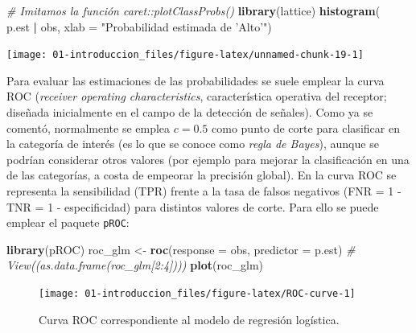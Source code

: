\documentclass[
]{book}
\newenvironment{Shaded}{\begin{snugshade}}{\end{snugshade}}
\newcommand{\CommentTok}[1]{\textcolor[rgb]{0.56,0.35,0.01}{\textit{#1}}}
\newcommand{\DataTypeTok}[1]{\textcolor[rgb]{0.13,0.29,0.53}{#1}}
\newcommand{\KeywordTok}[1]{\textcolor[rgb]{0.13,0.29,0.53}{\textbf{#1}}}
\newcommand{\NormalTok}[1]{#1}
\newcommand{\OperatorTok}[1]{\textcolor[rgb]{0.81,0.36,0.00}{\textbf{#1}}}
\newcommand{\StringTok}[1]{\textcolor[rgb]{0.31,0.60,0.02}{#1}}
\theoremstyle{break}
\theoremstyle{definition}
\theoremstyle{definition}
\theoremstyle{definition}
\theoremstyle{remark}
\begin{document}
\begin{Shaded}
\begin{Highlighting}[]
\CommentTok{# Imitamos la función caret::plotClassProbs()}
\KeywordTok{library}\NormalTok{(lattice) }
\KeywordTok{histogram}\NormalTok{(}\OperatorTok{~}\StringTok{ }\NormalTok{p.est }\OperatorTok{|}\StringTok{ }\NormalTok{obs, }\DataTypeTok{xlab =} \StringTok{"Probabilidad estimada de 'Alto'"}\NormalTok{)}
\end{Highlighting}
\end{Shaded}

\begin{center}\texttt{[image: 01-introduccion\_files/figure-latex/unnamed-chunk-19-1]} \end{center}

Para evaluar las estimaciones de las probabilidades se suele emplear la curva ROC (\emph{receiver operating characteristics}, característica operativa del receptor; diseñada inicialmente en el campo de la detección de señales).
Como ya se comentó, normalmente se emplea \(c = 0.5\) como punto de corte para clasificar en la categoría de interés (es lo que se conoce como \emph{regla de Bayes}), aunque se podrían considerar otros valores (por ejemplo para mejorar la clasificación en una de las categorías, a costa de empeorar la precisión global).
En la curva ROC se representa la sensibilidad (TPR) frente a la tasa de falsos negativos (FNR = 1 - TNR = 1 - especificidad) para distintos valores de corte.
Para ello se puede emplear el paquete \texttt{pROC}:

\begin{Shaded}
\begin{Highlighting}[]
\KeywordTok{library}\NormalTok{(pROC)}
\NormalTok{roc_glm <-}\StringTok{ }\KeywordTok{roc}\NormalTok{(}\DataTypeTok{response =}\NormalTok{ obs, }\DataTypeTok{predictor =}\NormalTok{ p.est)}
\CommentTok{# View((as.data.frame(roc_glm[2:4])))}
\KeywordTok{plot}\NormalTok{(roc_glm)}
\end{Highlighting}
\end{Shaded}

\begin{figure}[!htb]

{\centering \texttt{[image: 01-introduccion\_files/figure-latex/ROC-curve-1]} 

}

\caption{Curva ROC correspondiente al modelo de regresión logística.}\label{fig:ROC-curve}
\end{figure}
\end{document}
